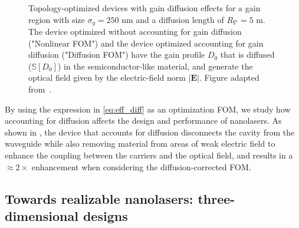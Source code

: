 \begin{figure}[tb]
    \centering
    \caption{Topology-optimized devices with gain diffusion effects for a gain region with size $\sigma_g=250$ nm and a diffusion length of $R_\nabla=5$ \textmu m. The device optimized without accounting for gain diffusion ("Nonlinear FOM") and the device optimized accounting for gain diffusion ("Diffusion FOM") have the gain profile $D_0$ that is diffused ($\mathbb{S}[D_0]$)
    in the semiconductor-like material, and generate the optical field given by the electric-field norm $\vert \mathbf{E} \vert$. Figure adapted from~\cite{ownpub4}.}
    \label{fig:laser_diff}
\end{figure}

By using the expression in \eqref{eq:eff_diff} as an optimization FOM, we study how accounting for diffusion
affects the design and performance of nanolasers. As shown in , the device that accounts for diffusion disconnects the cavity from the waveguide while also removing
material from areas of weak electric field to 
enhance the coupling between the carriers and the optical field, and results in a $\approx 2\times$ enhancement when considering the diffusion-corrected FOM. 

\subsection*{Towards realizable nanolasers: three-dimensional designs}


